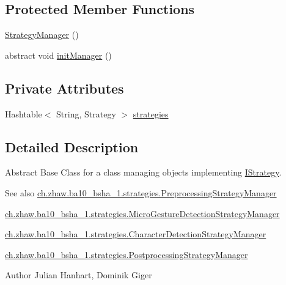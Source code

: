 \subsection*{Protected Member Functions}
\begin{DoxyCompactItemize}
\item 
\hyperlink{classch_1_1zhaw_1_1ba10__bsha__1_1_1strategies_1_1StrategyManager_3_01Strategy_01extends_01IStrategy_01_4_a6f169a8c68fda7de5893dd3ab27ba0d8}{StrategyManager} ()
\item 
abstract void \hyperlink{classch_1_1zhaw_1_1ba10__bsha__1_1_1strategies_1_1StrategyManager_3_01Strategy_01extends_01IStrategy_01_4_a26c82f07fcb5ab3eac259d278e128145}{initManager} ()
\end{DoxyCompactItemize}
\subsection*{Private Attributes}
\begin{DoxyCompactItemize}
\item 
Hashtable$<$ String, Strategy $>$ \hyperlink{classch_1_1zhaw_1_1ba10__bsha__1_1_1strategies_1_1StrategyManager_3_01Strategy_01extends_01IStrategy_01_4_adfc4680217e5979e5fac088970e0852f}{strategies}
\end{DoxyCompactItemize}


\subsection{Detailed Description}
Abstract Base Class for a class managing objects implementing \hyperlink{interfacech_1_1zhaw_1_1ba10__bsha__1_1_1strategies_1_1IStrategy}{IStrategy}.

\begin{DoxySeeAlso}{See also}
\hyperlink{classch_1_1zhaw_1_1ba10__bsha__1_1_1strategies_1_1PreprocessingStrategyManager}{ch.zhaw.ba10\_\-bsha\_\-1.strategies.PreprocessingStrategyManager} 

\hyperlink{classch_1_1zhaw_1_1ba10__bsha__1_1_1strategies_1_1MicroGestureDetectionStrategyManager}{ch.zhaw.ba10\_\-bsha\_\-1.strategies.MicroGestureDetectionStrategyManager} 

\hyperlink{classch_1_1zhaw_1_1ba10__bsha__1_1_1strategies_1_1CharacterDetectionStrategyManager}{ch.zhaw.ba10\_\-bsha\_\-1.strategies.CharacterDetectionStrategyManager} 

\hyperlink{classch_1_1zhaw_1_1ba10__bsha__1_1_1strategies_1_1PostprocessingStrategyManager}{ch.zhaw.ba10\_\-bsha\_\-1.strategies.PostprocessingStrategyManager}
\end{DoxySeeAlso}
\begin{DoxyAuthor}{Author}
Julian Hanhart, Dominik Giger 
\end{DoxyAuthor}

